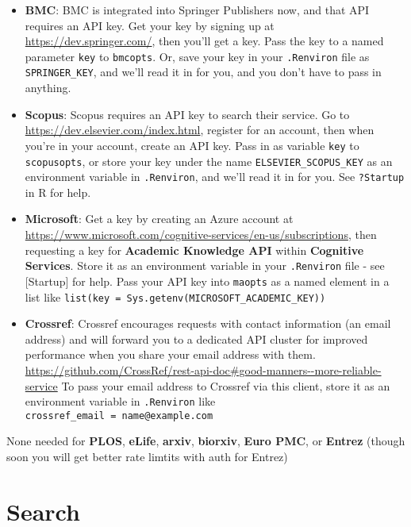 \documentclass[]{book}
\providecommand{\tightlist}{%
  \setlength{\itemsep}{0pt}\setlength{\parskip}{0pt}}
\theoremstyle{definition}
\theoremstyle{definition}
\theoremstyle{definition}
\theoremstyle{remark}
\begin{document}
\begin{itemize}
\tightlist
\item
  \textbf{BMC}: BMC is integrated into Springer Publishers now, and that
  API requires an API key. Get your key by signing up at
  \url{https://dev.springer.com/}, then you'll get a key. Pass the key
  to a named parameter \texttt{key} to \texttt{bmcopts}. Or, save your
  key in your \texttt{.Renviron} file as \texttt{SPRINGER\_KEY}, and
  we'll read it in for you, and you don't have to pass in anything.
\item
  \textbf{Scopus}: Scopus requires an API key to search their service.
  Go to \url{https://dev.elsevier.com/index.html}, register for an
  account, then when you're in your account, create an API key. Pass in
  as variable \texttt{key} to \texttt{scopusopts}, or store your key
  under the name \texttt{ELSEVIER\_SCOPUS\_KEY} as an environment
  variable in \texttt{.Renviron}, and we'll read it in for you. See
  \texttt{?Startup} in R for help.
\item
  \textbf{Microsoft}: Get a key by creating an Azure account at
  \url{https://www.microsoft.com/cognitive-services/en-us/subscriptions},
  then requesting a key for \textbf{Academic Knowledge API} within
  \textbf{Cognitive Services}. Store it as an environment variable in
  your \texttt{.Renviron} file - see {[}Startup{]} for help. Pass your
  API key into \texttt{maopts} as a named element in a list like
  \texttt{list(key\ =\ Sys.getenv(\textquotesingle{}MICROSOFT\_ACADEMIC\_KEY\textquotesingle{}))}
\item
  \textbf{Crossref}: Crossref encourages requests with contact
  information (an email address) and will forward you to a dedicated API
  cluster for improved performance when you share your email address
  with them.
  \url{https://github.com/CrossRef/rest-api-doc\#good-manners--more-reliable-service}
  To pass your email address to Crossref via this client, store it as an
  environment variable in \texttt{.Renviron} like
  \texttt{crossref\_email\ =\ name@example.com}
\end{itemize}

None needed for \textbf{PLOS}, \textbf{eLife}, \textbf{arxiv},
\textbf{biorxiv}, \textbf{Euro PMC}, or \textbf{Entrez} (though soon you
will get better rate limtits with auth for Entrez)

\hypertarget{search}{%
\chapter{Search}\label{search}}
\end{document}
